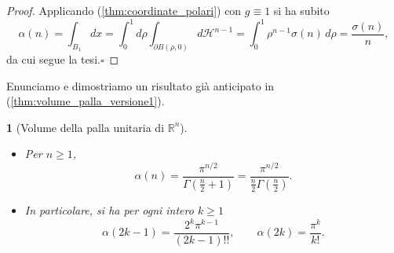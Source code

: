 \documentclass[a4paper,10pt,openright,oneside]{book}
\theoremstyle{theoremstyle}
\theoremstyle{theoremstylewoheader}
\newtheorem{teorema2}[teorema]{}
\theoremstyle{theoremstyle}
\theoremstyle{proofsecstyle}
\theoremstyle{nonumberplain}
\newtheorem{proof}{Dim.}
\newcommand{\RR}{\ensuremath{\mathbb{R}}}
\newcommand{\Haus}{\ensuremath{\mathcal{H}}}
\newcommand{\boundary}[1]{\ensuremath{\partial #1}}
\renewcommand{\qedsymbol}{\ensuremath{\square}}
\newcommand{\qed}{\unskip\nobreak\hfill\nobreak\hspace{.5em}\qedsymbol}
\begin{document}
\begin{proof}
Applicando (\ref{thm:coordinate_polari}) con $g \equiv 1$ si ha subito
\[
\alpha(n) = \int_{B_1} dx = \int_0^1 d\rho \int_{\boundary{B(\rho,0)}} d\Haus^{n-1} = \int_0^1 \rho^{n-1}\sigma(n)\, d\rho = \frac{\sigma(n)}{n},
\]
da cui segue la tesi.\qed
\end{proof}

\noindent Enunciamo e dimostriamo un risultato già anticipato in (\ref{thm:volume_palla_versione1}).

\begin{teorema2}[Volume della palla unitaria di $\RR^n$]
\label{thm:volume_palla_versione2}
\mbox{}
\begin{itemize}
\item[(i)]
Per $n \ge 1$,
\[
\alpha(n) = \frac{\pi^{n/2}}{\Gamma(\frac{n}{2} + 1)} = \frac{\pi^{n/2}}{\frac{n}{2} \Gamma(\frac{n}{2})}.
\]
\item[(ii)]
In particolare, si ha per ogni intero $k \ge 1$
\[
\alpha(2k-1) = \frac{2^k \pi^{k-1}}{(2k-1)!!},\qquad \alpha(2k) = \frac{\pi^k}{k!}.
\]
\end{itemize}
\end{teorema2}
\end{document}
